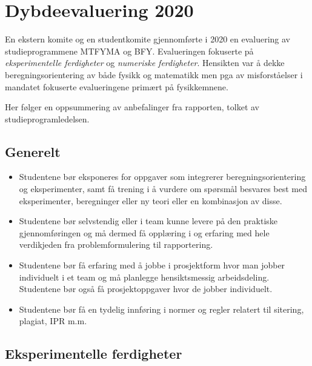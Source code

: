 \section{Dybdeevaluering 2020}

En ekstern komite og en studentkomite gjennomførte i 2020 en evaluering av studieprogrammene MTFYMA og BFY. Evalueringen fokuserte på \emph{eksperimentelle ferdigheter} og \emph{numeriske ferdigheter}. Hensikten var å dekke beregningsorientering av både fysikk og matematikk men pga av misforståelser i mandatet fokuserte evalueringene primært på fysikkemnene.

Her følger en oppsummering av anbefalinger fra rapporten, tolket av studieprogramledelsen.

\subsection{Generelt}

\begin{itemize}
	\item Studentene bør eksponeres for oppgaver som integrerer beregningsorientering og eksperimenter, samt få trening i å vurdere om spørsmål besvares best med eksperimenter, beregninger eller ny teori eller en kombinasjon av disse.
	\item Studentene bør selvstendig eller i team kunne levere på den praktiske gjennomføringen og må dermed få opplæring i og erfaring med hele verdikjeden fra problemformulering til rapportering.
	\item Studentene bør få erfaring med å jobbe i prosjektform hvor man jobber individuelt i et team og må planlegge hensiktsmessig arbeidsdeling. Studentene bør også få prosjektoppgaver hvor de jobber individuelt.
	\item Studentene bør få en tydelig innføring i normer og regler relatert til sitering, plagiat, IPR m.m.
\end{itemize}

\subsection{Eksperimentelle ferdigheter}

